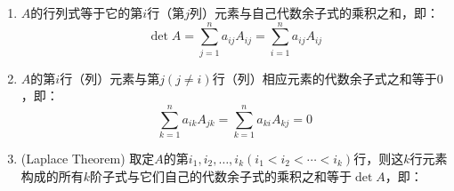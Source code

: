 \begin{property}
\begin{enumerate}
\begin{gather*}
\begin{vmatrix}
				\vdots & \vdots & \ddots & \vdots \\
				a_{n1} & a_{n2} & \cdots & a_{nn}
			\end{vmatrix}=
			\begin{vmatrix}
				a_{11} & a_{12} & \cdots & a_{1n} \\
				\vdots & \vdots & \ddots & \vdots \\
				a_{i1} & a_{i2} & \cdots & a_{in} \\
				\vdots & \vdots & \ddots & \vdots \\
				a_{j1} & a_{j2} & \cdots & a_{jn} \\
				\vdots & \vdots & \ddots & \vdots \\
				a_{n1} & a_{n2} & \cdots & a_{nn}
			\end{vmatrix} \\
			\begin{vmatrix}
				a_{11} & \cdots & a_{1i} & \cdots & a_{1j}+ka_{1i} & \cdots & a_{1n} \\
				a_{21} & \cdots & a_{2i} & \cdots & a_{2j}+ka_{2i} & \cdots & a_{2n} \\
				\vdots & \ddots & \vdots & \ddots & \vdots & \ddots & \vdots \\
				a_{n1} & \cdots & a_{ni} & \cdots & a_{nj}+ka_{ni}  & \cdots & a_{nn}
			\end{vmatrix}=
			\begin{vmatrix}
				a_{11} & \cdots & a_{1i} & \cdots & a_{1j} & \cdots & a_{1n} \\
				a_{21} & \cdots & a_{2i} & \cdots & a_{2j} & \cdots & a_{2n} \\
				\vdots & \ddots & \vdots & \ddots & \vdots & \ddots & \vdots \\
				a_{n1} & \cdots & a_{ni} & \cdots & a_{nj} & \cdots & a_{nn}
			\end{vmatrix}
		\end{gather*}
		\item $A$的行列式等于它的第$i$行（第$j$列）元素与自己代数余子式的乘积之和，即：
		\begin{equation*}
			\det A=\sum_{j=1}^{n}a_{ij}A_{ij}=\sum_{i=1}^{n}a_{ij}A_{ij}
		\end{equation*}
		\item $A$的第$i$行（列）元素与第$j(j\ne i)$行（列）相应元素的代数余子式之和等于$0$，即：
		\begin{equation*}
			\sum_{k=1}^{n}a_{ik}A_{jk}=\sum_{k=1}^{n}a_{ki}A_{kj}=0
		\end{equation*}
		\item (Laplace Theorem) 取定$A$的第$i_1,i_2,\dots,i_k(i_1<i_2<\cdots<i_k)$行，则这$k$行元素构成的所有$k$阶子式与它们自己的代数余子式的乘积之和等于$\det A$，即：

\end{enumerate}
\end{property}
